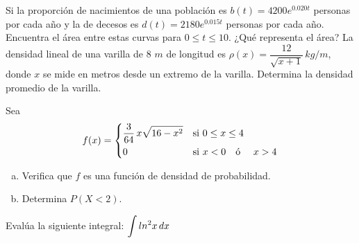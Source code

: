 \documentclass[12pt]{exam}
\begin{document}
\begin{questions}
        \question Si la proporción de nacimientos de una población es $b(t)=4200e^{0.020t}$ personas por cada año y la de decesos es $d(t)=2180e^{0.015t}$ personas por cada año. Encuentra el área entre estas curvas para $0\leq t\leq 10$. ¿Qué representa el área?
\vskip12pt
        \question La densidad lineal de una varilla de 8 $m$ de longitud es $\rho(x)=\dfrac{12}{\sqrt{x+1}} \, kg/m$, donde $x$ se mide en metros desde un extremo de la varilla. Determina la densidad promedio de la varilla. 
\vskip12pt

    \question 
    Sea $$ f(x) = \begin{dcases} \dfrac{3}{64}\,x\sqrt{16-x^2} & \text{si } 0 \leq x \leq 4 \\ 0 & \text{si } x < 0 \quad \text{ó }\quad  x > 4 \end{dcases}$$
    \begin{enumerate}[a)]
    \item Verifica que $f$ es una función de densidad de probabilidad.
    \item Determina $P(X<2)$.
\end{enumerate}
 \vskip12pt       
\question Evalúa la siguiente integral:   
    $\mathlarger{\int ln^2x\,dx}$
    
\end{questions}{}







\pagestyle{foot}    %



\end{document}
